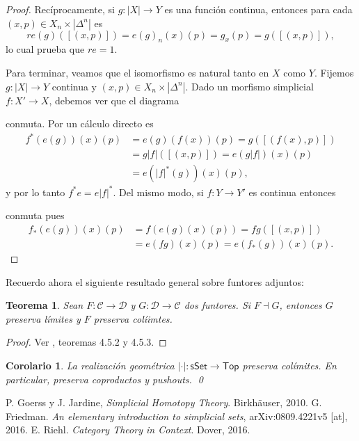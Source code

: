 \documentclass[11pt]{report}
\theoremstyle{colored}
\newtheorem{theorem}{Teorema}[section]
\newtheorem{corollary}{Corolario}[section]
\newcommand{\cat}[1]{\mathsf{#1}}
\renewcommand{\ss}[1]{\Delta^{#1}}
\begin{document}
\begin{proof}
Recíprocamente, si $g : |X| \to Y$ es una función continua, entonces para cada $(x,p) \in X_n \times |\ss{n}|$ es
\[
r e(g)([(x,p)]) = e(g)_n(x)(p) = g_x(p) = g([(x,p)]),
\]
lo cual prueba que $r e  = 1$.

Para terminar, veamos que el isomorfismo es natural tanto en $X$ como $Y$. Fijemos $g : |X| \to Y$ continua y $(x,p) \in X_n \times |\ss{n}|$. Dado un morfismo simplicial $f : X' \to X$, debemos ver que el diagrama
\begin{center}
\end{center}
conmuta. Por un cálculo directo es
\begin{align*}
f^*(e(g))(x)(p) &= e(g)(f(x))(p) = g([(f(x),p)])\\
& = g|f|([(x,p)]) = e(g|f|)(x)(p)\\
& = e(|f|^*(g))(x)(p),
\end{align*}
y por lo tanto $f^*e = e|f|^*$. Del mismo modo, si $f : Y \to Y'$ es continua entonces
\begin{center}
\end{center}
conmuta pues
\begin{align*}
f_*(e(g))(x)(p) &= f(e(g)(x)(p)) = fg([(x,p)])\\
&= e(fg)(x)(p) = e(f_*(g))(x)(p).
\end{align*}
\end{proof}

Recuerdo ahora el siguiente resultado general sobre funtores adjuntos:

\begin{theorem} Sean $F : \mathscr{C} \to \mathscr{D}$ y $G : \mathscr{D} \to \mathscr{C}$ dos funtores. Si $F \dashv G$, entonces $G$ preserva límites y $F$ preserva colíimtes. 
\end{theorem}
\begin{proof} Ver \cite{ct-context}, teoremas 4.5.2 y 4.5.3.
\end{proof}

\begin{corollary} La realización geométrica $| \cdot | : \cat{sSet} \to \cat{Top}$ preserva colímites. En particular, preserva coproductos y pushouts. \qed
\end{corollary}

\begin{thebibliography}{}
 P. Goerss y J. Jardine, \textit{Simplicial Homotopy Theory}. Birkhäuser, 2010.
 G. Friedman. \textit{An elementary introduction to simplicial sets}, arXiv:0809.4221v5 [at], 2016.
 E. Riehl. \textit{Category Theory in Context}. Dover, 2016.
\end{thebibliography}
\end{document}
